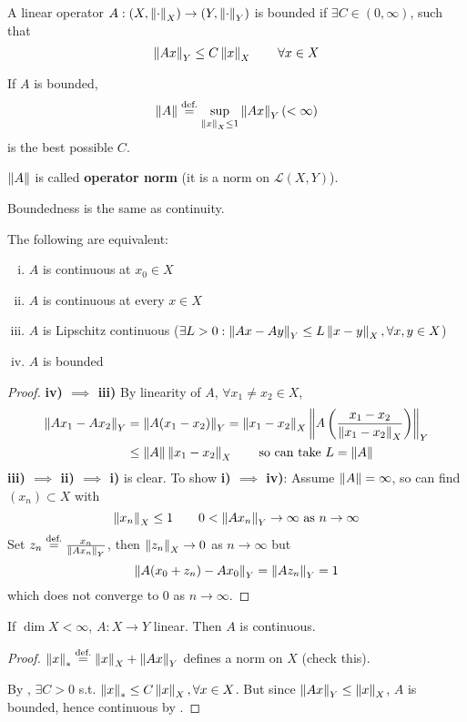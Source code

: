 \documentclass{article}
\begin{document}
\begin{definition}\nl
    A linear operator $A: (X, \left\|{\cdot}\right\|_X) \to (Y, \left\|{\cdot}\right\|_Y)$ is bounded if $\exists C \in (0, \infty)$, such that  
    $$
    \left\|{Ax}\right\|_Y \leq C \left\|{x}\right\|_X \qquad \forall x \in X
    $$
\end{definition}

If $A$ is bounded, 
$$
\left\|{A}\right\| \stackrel{\text{def.}}{=} \sup_{\left\|{x}\right\|_X\leq 1} \left\|{Ax}\right\|_Y (<\infty)
$$
is the best possible $C$.  

$\left\|{A}\right\|$ is called \textbf{operator norm} (it is a norm on $\mathcal{L}(X,Y)$).  

Boundedness is the same as continuity.  

\begin{theorem}
\label{equivalent defn of bounded operators}
    The following are equivalent:  
    \begin{enumerate}[i)]
        \item $A$ is continuous at $x_0\in X$
        \item $A$ is continuous at every $x \in X$
        \item $A$ is Lipschitz continuous ($\exists L > 0: \left\|{Ax-Ay}\right\|_Y \leq L \left\|{x-y}\right\|_X, \forall x,y\in X$)
        \item $A$ is bounded
    \end{enumerate}
\end{theorem}
\begin{proof}
    \textbf{iv) $\implies$ iii)}\nl
    By linearity of $A$, $\forall x_1\neq x_2 \in X$,  
    \begin{align*}
        \norm{Ax_1 - Ax_2}_Y &= \norm{A(x_1-x_2)}_Y = \norm{x_1-x_2}_X \norm{A \left(\frac{x_1-x_2}{\norm{x_1-x_2}_X}\right)}_Y \\
        &\leq \norm{A} \norm{x_1-x_2}_X \qquad \text{so\ can\ take\ } L = \norm{A}
    \end{align*}
    \textbf{iii) $\implies$ ii) $\implies$ i)} is clear.  
    To show \textbf{i) $\implies$ iv)}:\nl
    Assume $\left\|{A}\right\|=\infty$, so can find $(x_n) \subset X$ with  
    $$
    \left\|{x_n}\right\|_X \leq 1 \qquad 0 < \left\|{Ax_n}\right\|_Y \to \infty \text{\ as\ } n\to \infty
    $$
    Set $z_n \stackrel{\text{def.}}{=} \frac{x_n}{\left\|{Ax_n}\right\|_Y}$,  then $\left\|{z_n}\right\|_X \to 0$ as $n\to \infty$ but 
    $$
    \left\|{A(x_0+z_n)-Ax_0}\right\|_Y = \left\|{Az_n}\right\|_Y = 1
    $$
    which does not converge to $0$ as $n\to \infty$.
\end{proof}

\begin{corollary}
    If $\dim X < \infty$, $A: X\to Y$ linear. Then $A$ is continuous.
\end{corollary}  
\begin{proof}
    $\left\|{x}\right\|_* \stackrel{\text{def.}}{=} \left\|{x}\right\|_X + \left\|{Ax}\right\|_Y$ defines a norm on $X$ (check this).  
    
    By , $\exists C>0$ s.t. $\left\|{x}\right\|_* \leq C \left\|{x}\right\|_X, \forall x \in X$. But since $\left\|{Ax}\right\|_Y \leq \left\|{x}\right\|_X$, $A$ is bounded, hence continuous by .
\end{proof}
\end{document}

